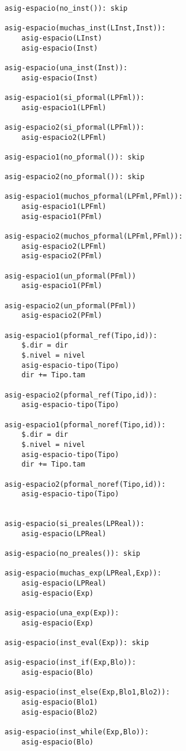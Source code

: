 \begin{lstlisting}
    asig-espacio(no_inst()): skip

    asig-espacio(muchas_inst(LInst,Inst)):
        asig-espacio(LInst)
        asig-espacio(Inst)

    asig-espacio(una_inst(Inst)):
        asig-espacio(Inst)

    asig-espacio1(si_pformal(LPFml)):
        asig-espacio1(LPFml)

    asig-espacio2(si_pformal(LPFml)):
        asig-espacio2(LPFml)

    asig-espacio1(no_pformal()): skip

    asig-espacio2(no_pformal()): skip

    asig-espacio1(muchos_pformal(LPFml,PFml)):
        asig-espacio1(LPFml)
        asig-espacio1(PFml)

    asig-espacio2(muchos_pformal(LPFml,PFml)):
        asig-espacio2(LPFml)
        asig-espacio2(PFml)

    asig-espacio1(un_pformal(PFml))
        asig-espacio1(PFml)

    asig-espacio2(un_pformal(PFml))
        asig-espacio2(PFml)

    asig-espacio1(pformal_ref(Tipo,id)):
        $.dir = dir
        $.nivel = nivel
        asig-espacio-tipo(Tipo)
        dir += Tipo.tam

    asig-espacio2(pformal_ref(Tipo,id)):
        asig-espacio-tipo(Tipo)

    asig-espacio1(pformal_noref(Tipo,id)):
        $.dir = dir
        $.nivel = nivel
        asig-espacio-tipo(Tipo)
        dir += Tipo.tam

    asig-espacio2(pformal_noref(Tipo,id)):
        asig-espacio-tipo(Tipo)
        

    asig-espacio(si_preales(LPReal)):
        asig-espacio(LPReal)

    asig-espacio(no_preales()): skip

    asig-espacio(muchas_exp(LPReal,Exp)):
        asig-espacio(LPReal)
        asig-espacio(Exp)

    asig-espacio(una_exp(Exp)):
        asig-espacio(Exp)

    asig-espacio(inst_eval(Exp)): skip

    asig-espacio(inst_if(Exp,Blo)):
        asig-espacio(Blo)

    asig-espacio(inst_else(Exp,Blo1,Blo2)):
        asig-espacio(Blo1)
        asig-espacio(Blo2)

    asig-espacio(inst_while(Exp,Blo)):
        asig-espacio(Blo)


\end{lstlisting}
